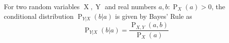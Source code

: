 For two random variables  $\operatorname{X}, \operatorname{Y}$ and real numbers $a, b : \operatorname{P}_X(a) > 0$, the conditional distribution $\operatorname{P}_{Y | X}(b | a)$ is given by Bayes' Rule as
$$\operatorname{P}_{Y | X}(b | a) = \frac{\operatorname{P}_{X,Y}(a, b)}{\operatorname{P}_X(a)}$$

